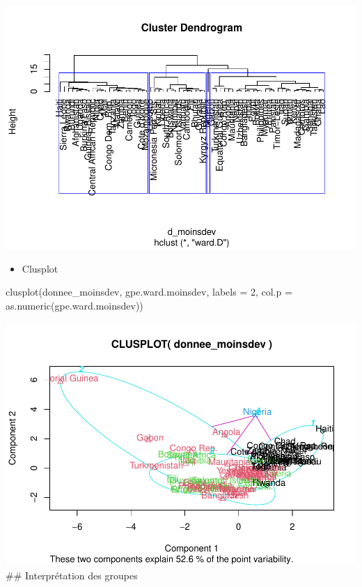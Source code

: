 \documentclass[
]{article}
\newenvironment{Shaded}{}{}
\newcommand{\AttributeTok}[1]{#1}
\newcommand{\DecValTok}[1]{#1}
\newcommand{\FunctionTok}[1]{#1}
\newcommand{\NormalTok}[1]{#1}
\providecommand{\tightlist}{%
  \setlength{\itemsep}{0pt}\setlength{\parskip}{0pt}}
\begin{document}
\includegraphics{Projet_files/figure-latex/unnamed-chunk-32-1.pdf}

\begin{itemize}
\tightlist
\item
  Clusplot
\end{itemize}

\begin{Shaded}
\begin{Highlighting}[]
\FunctionTok{clusplot}\NormalTok{(donnee\_moinsdev, gpe.ward.moinsdev, }\AttributeTok{labels =} \DecValTok{2}\NormalTok{, }\AttributeTok{col.p =} \FunctionTok{as.numeric}\NormalTok{(gpe.ward.moinsdev))}
\end{Highlighting}
\end{Shaded}

\includegraphics{Projet_files/figure-latex/unnamed-chunk-33-1.pdf} \#\#
Interprétation des groupes
\end{document}

